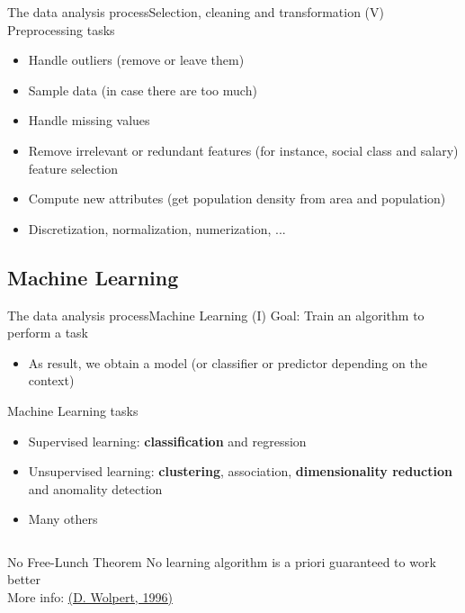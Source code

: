 \documentclass[10pt,compress]{beamer} %
\begin{document}
\begin{frame}{The data analysis process}{Selection, cleaning and transformation (V)}
	Preprocessing tasks
		\begin{itemize}
		\item Handle outliers (remove or leave them)
		\item Sample data (in case there are too much)
		\item Handle missing values
		\item Remove irrelevant or redundant features (for instance, social class and salary) \alert{feature selection}
		\item Compute new attributes (get population density from area and population)
		\item Discretization, normalization, numerization, ...
		\end{itemize}
\end{frame}

\subsection{Machine Learning}
\begin{frame}{The data analysis process}{Machine Learning (I)}
	Goal: Train an algorithm to perform a task
		\begin{itemize}
		\item As result, we obtain a \alert{model} (or \alert{classifier} or \alert{predictor} depending on the context)
		\end{itemize}

	Machine Learning tasks
		\begin{itemize}
		\item Supervised learning: \textbf{classification} and regression
		\item Unsupervised learning: \textbf{clustering}, association, \textbf{dimensionality reduction} and anomality detection
		\item Many others
		\end{itemize}

	\vspace{-0.5cm}
	 \begin{flushright}
		\begin{columns}
		\begin{block}{No Free-Lunch Theorem}
		No learning algorithm is a priori guaranteed to work better\\
		More info: \href{http://citeseerx.ist.psu.edu/viewdoc/download?doi=10.1.1.390.9412&rep=rep1&type=pdf}{(D. Wolpert, 1996)}
		\end{block}
		\end{columns}
	 \end{flushright}

\end{frame}
\end{document}
